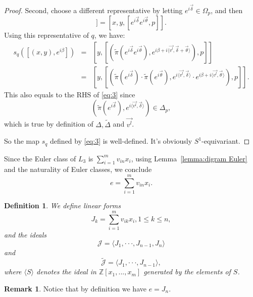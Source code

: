 \documentclass[12pt]{amsart}
\newtheorem{definition}[theorem]{Definition}
\theoremstyle{definition}
\newtheorem{remark}[theorem]{Remark}
\numberwithin{equation}{section}
\begin{document}
\begin{proof}
Second, choose a different representative by letting
$e^{i\vec{\delta}}\in \Omega_{p}$, and then
\begin{equation}
[x,y,[e^{i\vec{\theta}},p]]=[x,y,[e^{i\vec{\delta}}e^{i\vec{\theta}},p]].
\end{equation}
Using this representative of $q$, we have:
\begin{eqnarray*}\label{eq:5}
s_{q}([(x,y),e^{i\beta}]) & = &
[y,[(\tilde{\pi}(e^{i\vec{\delta}}e^{i\vec{\theta}}),e^{i\beta+i\langle
\vec{v^{l}},\vec{\delta}+\vec{\theta}\rangle}),p]]\\
& = &
[y,[(\tilde{\pi}(e^{i\vec{\delta}})\cdot\tilde{\pi}(e^{i\vec{\theta}}),e^{i\langle\vec{v^l},\vec{\delta}\rangle}\cdot
e^{i\beta+i\langle\vec{v^l},\vec{\theta}\rangle}),p]].
\end{eqnarray*}
This also equals to the RHS of \eqref{eq:3} since
\begin{equation}\label{eq:6}
(\tilde{\pi}(e^{i\vec{\delta}}),e^{i\langle\vec{v^l},\vec{\delta}\rangle})\in
\Delta_{p},
\end{equation}
which is true by definition of $\Delta, \widetilde{\Delta}$ and
$\vec{v^l}$.

So the map $s_{q}$ defined by \eqref{eq:3} is well-defined. It's
obviously $S^{1}$-equivariant.
\end{proof}

Since the Euler class of $L_{3}$ is $\sum_{i=1}^{m}v_{in}x_{i}$,
using Lemma~\ref{lemma:digram Euler} and  the naturality of Euler
classes, we conclude
\begin{equation}\label{eq:e}
e=\sum_{i=1}^{m}v_{in}x_{i}.
\end{equation}

\begin{definition}
We define linear forms
\begin{equation}
J_{k}=\sum_{i=1}^{m}v_{ik}x_{i}, 1\leq k\leq n,
\end{equation}
and the ideals
\begin{equation}
{{\mathcal{J}}} = \langle J_{1},{{\cdot\cdot\cdot}},J_{n-1},J_{n}\rangle
\end{equation}
and
\begin{equation}
\widetilde{{\mathcal{J}}}=\langle J_{1},{{\cdot\cdot\cdot}},J_{n-1}\rangle,
\end{equation}
where $\langle S \rangle$ denotes the ideal in ${{\mathbb{Z}}}[x_{1},...,x_{m}]$
generated by the elements of $S$.
\end{definition}
\begin{remark}
Notice that by definition we have $e=J_{n}$.
\end{remark}
\end{document}
